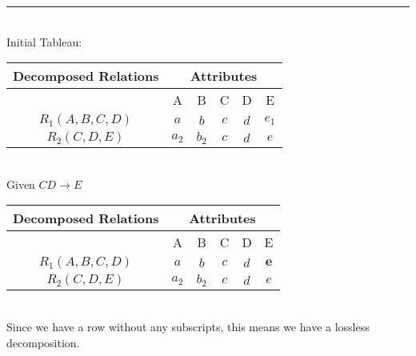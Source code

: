 \documentclass[12pt]{article}
\begin{document}
\noindent\rule{\textwidth}{1pt}\\[0.5cm]
Initial Tableau:\\[0.5cm]
\begin{tabular}{|c||c|c|c|c|c|}
    \hline
    {\cellcolor{gray!25}Decomposed Relations} & \multicolumn{5}{c|}{\cellcolor{gray!25}Attributes}                             \\
    \hline
    \hline
    {\cellcolor{gray!25}}                     &
    {\cellcolor{gray!25}A}                    &
    {\cellcolor{gray!25}B}                    &
    {\cellcolor{gray!25}C}                    &
    {\cellcolor{gray!25}D}                    &
    {\cellcolor{gray!25}E}                                                                                                     \\
    \hline
    \hline
    $R_1 (A, B, C, D)$                        & $a$                                                & $b$   & $c$ & $d$ & $e_1$ \\
    \hline
    $R_2 (C, D, E)$                           & $a_2$                                              & $b_2$ & $c$ & $d$ & $e$   \\
    \hline
\end{tabular}\\[0.5cm]
Given $CD \rightarrow E$\\[0.5cm]
\begin{tabular}{|c||c|c|c|c|c|}
    \hline
    {\cellcolor{gray!25}Decomposed Relations} & \multicolumn{5}{c|}{\cellcolor{gray!25}Attributes}                                \\
    \hline
    \hline
    {\cellcolor{gray!25}}                     &
    {\cellcolor{gray!25}A}                    &
    {\cellcolor{gray!25}B}                    &
    {\cellcolor{gray!25}C}                    &
    {\cellcolor{gray!25}D}                    &
    {\cellcolor{gray!25}E}                                                                                                        \\
    \hline
    \hline
    $R_1 (A, B, C, D)$                        & $a$                                                & $b$   & $c$ & $d$ & $\bm{e}$ \\
    \hline
    $R_2 (C, D, E)$                           & $a_2$                                              & $b_2$ & $c$ & $d$ & $e$      \\
    \hline
\end{tabular}\\[0.5cm]
Since we have a row without any subscripts, this means we have a lossless decomposition.
\end{document}
